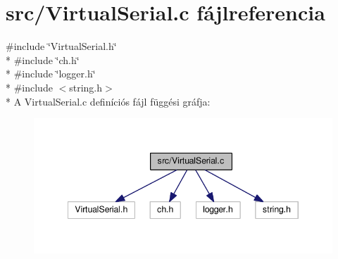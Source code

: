 \section{src/\-Virtual\-Serial.c fájlreferencia}
\label{_virtual_serial_8c}
{\ttfamily \#include \char`\"{}Virtual\-Serial.\-h\char`\"{}}\\*
{\ttfamily \#include \char`\"{}ch.\-h\char`\"{}}\\*
{\ttfamily \#include \char`\"{}logger.\-h\char`\"{}}\\*
{\ttfamily \#include $<$string.\-h$>$}\\*
A Virtual\-Serial.\-c definíciós fájl függési gráfja\-:
\nopagebreak
\begin{figure}[H]
\begin{center}
\leavevmode
\includegraphics[width=345pt]{_virtual_serial_8c__incl}
\end{center}
\end{figure}
